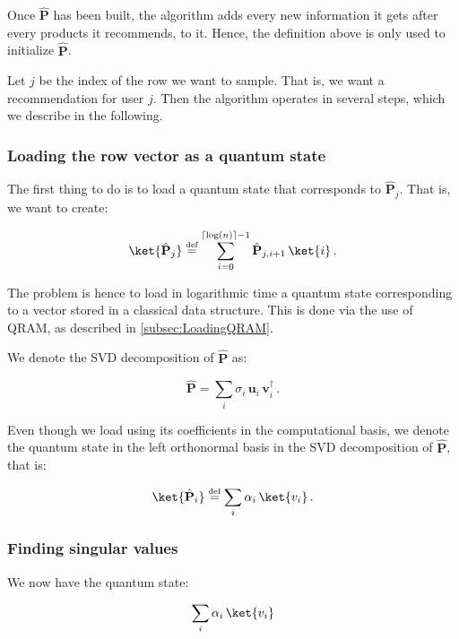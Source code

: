 \documentclass[11pt, a4paper]{article}
\begin{document}
            Once \(\hat{\mathbf{P}}\) has been built, the algorithm adds every new information it gets after every products it recommends, to it. Hence, the definition above is only used to initialize \(\hat{\mathbf{P}}\).
            
            Let \(j\) be the index of the row we want to sample. That is, we want a recommendation for user \(j\). Then the algorithm operates in several steps, which we describe in the following.
            
            \subsubsection{Loading the row vector as a quantum state}
                \label{subsubsec:Loading}
                The first thing to do is to load a quantum state that corresponds to \(\hat{\mathbf{P}}_j\). That is, we want to create:
                
                \[\ket{\hat{\mathbf{P}}_j} \overset{\text{\tiny{def}}}{=} \sum_{i=0}^{\lceil\log(n)\rceil-1}\hat{\mathbf{P}}_{j,i + 1}\,\ket{i}\,.\]
                
                The problem is hence to load in logarithmic time a quantum state corresponding to a vector stored in a classical data structure. This is done via the use of QRAM, as described in \autoref{subsec:LoadingQRAM}.
                
                We denote the SVD decomposition of \(\hat{\mathbf{P}}\) as:
                
                \[\hat{\mathbf{P}} = \sum_{i}\sigma_i\,\mathbf{u}_i\,\mathbf{v}_i^\dagger\,.\]
                
                Even though we load  using its coefficients in the computational basis, we denote the quantum state in the left orthonormal basis in the SVD decomposition of \(\hat{\mathbf{P}}\), that is:
                
                \[\ket{\hat{\mathbf{P}}_i} \overset{\text{\tiny{def}}}{=} \sum_{i}\alpha_i\,\ket{v_i}\,.\]
                
            \subsubsection{Finding singular values}
                We now have the quantum state:
                
                \[\sum_{i}\alpha_i\,\ket{v_i}\]
                
\end{document}
